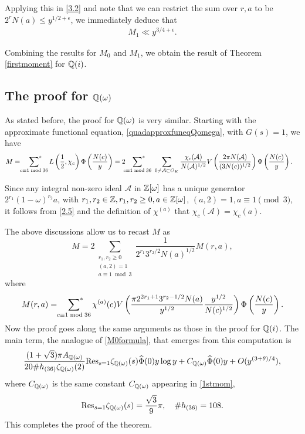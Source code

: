 \documentclass[twoside,leqno,10pt, A4]{amsart}
\begin{document}
  Applying this in \eqref{3.2} and note that we can restrict the sum over $r, a$ to be $2^r N(a) \leq y^{1/2+\epsilon}$, we immediately deduce that
\begin{align*}
   M_1 \ll y^{3/4+\epsilon}.
\end{align*}

Combining the results for $M_0$ and $M_1$, we obtain the result of Theorem \ref{firstmoment} for $\mathbb Q(i)$.

\subsection{The proof for $\mathbb Q(\omega)$}  As stated before, the proof for $\mathbb Q(\omega)$ is very similar.  Starting with the approximate functional equation, \eqref{quadapproxfuneqQomega}, with $G(s)=1$, we have
\begin{align*}
   M=\sideset{}{^*}\sum_{c \equiv 1 \bmod {36}}L \left( \frac{1}{2},
   \chi_c \right) \Phi \left( \frac{N(c)}{y} \right) &=2\sideset{}{^*}\sum_{c \equiv 1 \bmod {36}} \ \sum_{0 \neq \mathcal{A} \subset
  O_K} \frac{\chi_c(\mathcal{A})}{N(\mathcal{A})^{1/2}}V \left(\frac{2\pi N(\mathcal{A}) }{(3N(c))^{1/2}} \right) \Phi \left( \frac{N(c)}{y} \right).
\end{align*}

Since any integral non-zero ideal $\mathcal{A}$ in $\mathbb Z[\omega]$ has a unique generator
$2^{r_1}(1-\omega)^{r_2}a$, with $r_1, r_2\in \mathbb{Z}, r_1,r_2 \geq 0 , a \in \mathbb{Z}[\omega]$,  $(a, 2)=1, a \equiv 1 \pmod 3$, it follows from \eqref{2.5} and the definition of $\chi^{(a)}$ that $\chi_{c}(\mathcal{A}) = \chi_c(a)$. \newline

The above discussions allow us to recast $M$ as
\[  M= 2 \sum_{\substack{r_1,r_2 \geq 0 \\ (a,2)=1 \\ a \equiv 1 \bmod 3}} \frac{1}{2^{r_1}3^{r_2/2}N(a)^{1/2}}M(r,a),\]
where
\[ M(r,a)= \sideset{}{^*}\sum_{c \equiv 1 \bmod {36}}\chi^{(a)}(c)V\left( \frac{\pi 2^{2r_1+1}3^{r_2-1/2}N(a)}{y^{1/2}} \frac{y^{1/2}}{N(c)^{1/2}} \right ) \Phi \left( \frac{N(c)}{y} \right). \]
Now the proof goes along the same arguments as those in the proof for $\mathbb Q(i)$.  The main term, the analogue of \eqref{M0formula}, that emerges from this computation is
\[   \frac {(1+\sqrt{3})\pi A_{\mathbb Q(\omega)} }{20 \#h_{(36)}\zeta_{\mathbb Q(\omega)}(2)} \mathrm{Res}_{s=1} \zeta_{\mathbb Q(\omega)}(s)   \widehat{\Phi}(0) y\log y +C_{\mathbb Q(\omega)} \widehat{\Phi}(0)y+O(y^{(3+\theta)/4}), \]
   where $C_{\mathbb Q(\omega)}$ is the same constant $C_{\mathbb Q(\omega)}$ appearing in \eqref{1stmom}, 
\[  \mathrm{Res}_{s=1} \zeta_{\mathbb Q(\omega)}(s)  = \frac{\sqrt{3}}{9} \pi , \quad   \#h_{(36)} = 108. \]   
This completes the proof of the theorem.
\end{document}
